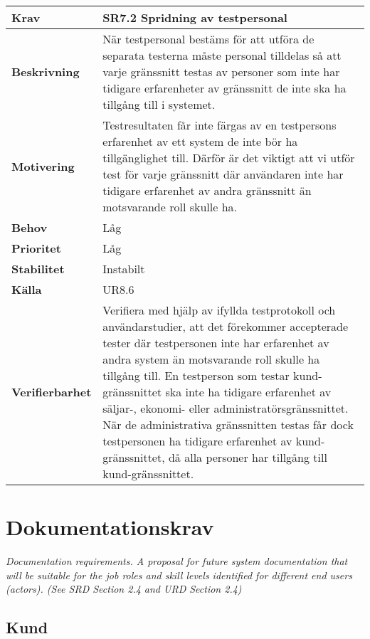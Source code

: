 \documentclass[a4paper, twoside, 11pt, titlepage]{article}
\begin{document}
	\begin{tabular} { p{2.6cm} p{12.5cm} }
		\hline
		\sffamily\textbf{Krav} & \sffamily\textbf{SR7.2 Spridning av testpersonal } \\
		\hline
		\sffamily\textbf{Beskrivning} & När testpersonal bestäms för att utföra de separata testerna måste personal tilldelas så att varje gränssnitt testas av personer som inte har tidigare erfarenheter av gränssnitt de inte ska ha tillgång till i systemet.  \\
		\hline
		\sffamily\textbf{Motivering} & Testresultaten får inte färgas av en testpersons erfarenhet av ett system de inte bör ha tillgänglighet till. Därför är det viktigt att vi utför test för varje gränssnitt där användaren inte har tidigare erfarenhet av andra gränssnitt än motsvarande roll skulle ha.  \\
		\hline
		\sffamily\textbf{Behov} & Låg  \\
		\hline
		\sffamily\textbf{Prioritet} & Låg  \\
		\hline
		\sffamily\textbf{Stabilitet} & Instabilt  \\
		\hline
		\sffamily\textbf{Källa} & UR8.6  \\
		\hline
		\sffamily\textbf{Verifierbarhet} & Verifiera med hjälp av ifyllda testprotokoll och användarstudier, att det förekommer accepterade tester där testpersonen inte har erfarenhet av andra system än motsvarande roll skulle ha tillgång till.  En testperson som testar kund-gränssnittet ska inte ha tidigare erfarenhet av säljar-, ekonomi- eller administratörsgränssnittet. När de administrativa gränssnitten testas får dock  testpersonen ha tidigare erfarenhet av kund-gränssnittet, då alla personer har tillgång till kund-gränssnittet.  \\
		\hline
	\end{tabular}


\clearpage
\section{Dokumentationskrav}


\emph{Documentation requirements. A proposal for future system documentation that will be suitable for the job roles and skill levels identified for different end users (actors). (See SRD Section 2.4 and URD Section 2.4)}

	\subsection{Kund}
\end{document}
